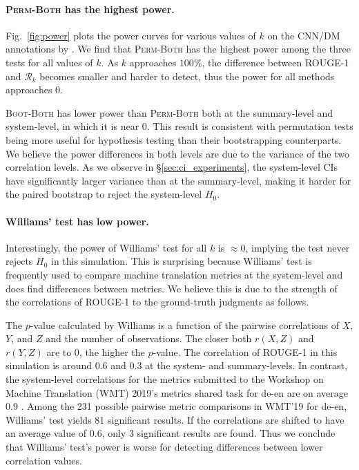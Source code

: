 

\paragraph{\textsc{Perm-Both} has the highest power.}
Fig.~\ref{fig:power} plots the power curves for various values of $k$ on the CNN/DM annotations by \citet{FKMSR21}.
We find that \textsc{Perm-Both} has the highest power among the three tests for all values of $k$.
As $k$ approaches $100\%$, the difference between ROUGE-1 and $\mathcal{R}_k$ becomes smaller and harder to detect, thus the power for all methods approaches 0.

\textsc{Boot-Both} has lower power than \textsc{Perm-Both} both at the summary-level and system-level, in which it is near 0.
This result is consistent with permutation tests being more useful for hypothesis testing than their bootstrapping counterparts.
We believe the power differences in both levels are due to the variance of the two correlation levels.
As we observe in \S\ref{sec:ci_experiments}, the system-level CIs have significantly larger variance than at the summary-level, making it harder for the paired bootstrap to reject the system-level $H_0$.



\paragraph{Williams' test has low power.}
Interestingly, the power of Williams' test for all $k$ is $\approx 0$, implying the test never rejects $H_0$ in this simulation.
This is surprising because Williams' test is frequently used to compare machine translation metrics at the system-level and does find differences between metrics.
We believe this is due to the strength of the correlations of ROUGE-1 to the ground-truth judgments as follows.

The $p$-value calculated by Williams is a function of the pairwise correlations of $X$, $Y$, and $Z$ and the number of observations.
The closer both $r(X, Z)$ and $r(Y, Z)$ are to 0, the higher the $p$-value.
The correlation of ROUGE-1 in this simulation is around 0.6 and 0.3 at the system- and summary-levels.
In contrast, the system-level correlations for the metrics submitted to the Workshop on Machine Translation (WMT) 2019's metrics shared task for de-en are on average 0.9 \citep{MWBG19}.
Among the 231 possible pairwise metric comparisons in WMT'19 for de-en, Williams' test yields 81 significant results.
If the correlations are shifted to have an average value of 0.6, only 3 significant results are found.
Thus we conclude that Williams' test's power is worse for detecting differences between lower correlation values.

